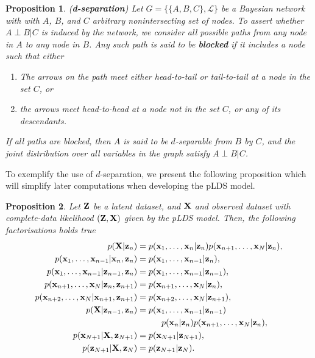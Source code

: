 \documentclass[11pt]{article}
\numberwithin{equation}{section}
\newcommand{\x}{{\bf x}}
\newcommand{\X}{{\bf X}}
\newcommand{\z}{{\bf z}}
\newcommand{\Z}{{\bf Z}}
\newtheorem{proposition}{Proposition}[section]
\begin{document}
\begin{proposition}
	(\textbf{d-separation}) Let $G = \{\{A, B, C\}, \mathcal L\}$ be a Bayesian network with with $A$, $B$, and $C$ arbitrary nonintersecting set of nodes. To assert whether $A \perp B \vert C$ is induced by the network, we consider all possible paths from any node in $A$ to any node in $B$. Any such path is said to be \textbf{blocked} if it includes a node such that either
	\begin{enumerate}
		\item The arrows on the path meet either head-to-tail or tail-to-tail at a node in the set $C$, or
		\item the arrows meet head-to-head at a node not in the set $C$, or any of its descendants.
	\end{enumerate}
	If all paths are blocked, then $A$ is said to be $d$-separable from $B$ by $C$, and the joint distribution over all variables in the graph satisfy $A \perp B \vert C$.
\end{proposition}


To exemplify the use of $d$-separation, we present the following proposition which will simplify later computations when developing the pLDS model.

\begin{proposition} \label{prop:graphical-models-separation}
	Let $\Z$ be a latent dataset, and $\X$ and observed dataset with complete-data likelihood $({\bf Z}, {\bf X})$ given by the pLDS model. Then, the following factorisations holds true
	\begin{align}
		p({\bf X}\vert\z_n) &= p({\x_1, \ldots, \x_n \vert \z_n})p({\x_{n+1}, \ldots, \x_N \vert \z_n}), \label{eq:gm-1}\\
		p(\x_1, \ldots, \x_{n-1}\vert \x_n, \z_n) &= p(\x_1, \ldots, \x_{n-1}\vert \z_n),\\
		p(\x_1, \ldots, \x_{n-1}\vert \z_{n-1}, \z_{n}) &= p(\x_1, \ldots, \x_{n-1}\vert \z_{n-1}),\\
		p(\x_{n+1}, \ldots, \x_N \vert \z_n, \z_{n+1}) &= p(\x_{n+1}, \ldots, \x_N \vert \z_n),\\
		p(\x_{n+2}, \ldots, \x_N\vert \x_{n+1}, \z_{n+1}) &= p(\x_{n+2}, \ldots, \x_N \vert \z_{n+1}),\\
		p({\bf X}\vert \z_{n-1}, \z_{n}) &= p(\x_1, \ldots, \x_{n-1}\vert \z_{n-1}) \nonumber\\
			&\hspace{1cm}p(\x_n\vert \z_n) p(\x_{n+1}, \ldots, \x_N \vert \z_n),\\
		p(\x_{N+1} \vert {\bf X}, \z_{N+1}) &= p(\x_{N+1} \vert \z_{N+1}),\\
		p(\z_{N+1} \vert {\bf X}, \z_{N}) &= p(\z_{N+1} \vert \z_{N}).\\
	\end{align}
\end{proposition}
\end{document}
